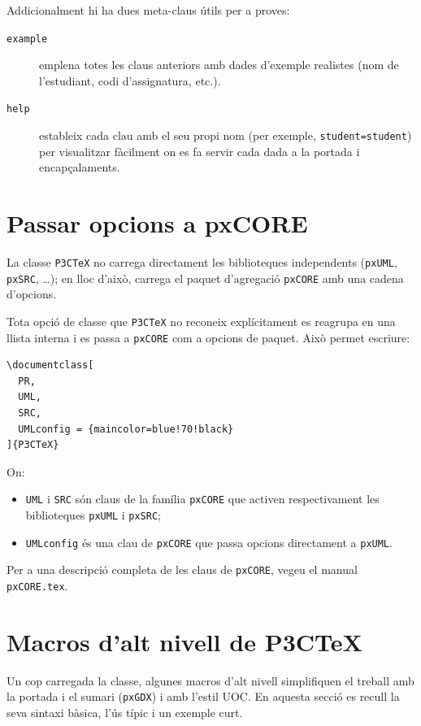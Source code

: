 \documentclass[default]{P3CTeX}
\begin{document}
Addicionalment hi ha dues meta-claus útils per a proves:

\begin{description}
  \item[\texttt{example}] emplena totes les claus anteriors amb dades
    d'exemple realistes (nom de l'estudiant, codi d'assignatura, etc.).
  \item[\texttt{help}] estableix cada clau amb el seu propi nom (per
    exemple, \texttt{student=student}) per visualitzar fàcilment on es
    fa servir cada dada a la portada i encapçalaments.
\end{description}

\section{Passar opcions a pxCORE}\label{sec:pxcore-bridge}

La classe \texttt{P3CTeX} no carrega directament les biblioteques
independents (\texttt{pxUML}, \texttt{pxSRC}, \dots); en lloc d'això,
carrega el paquet d'agregació \texttt{pxCORE} amb una cadena
d'opcions.

Tota opció de classe que \texttt{P3CTeX} no reconeix explícitament es
rea\-grupa en una llista interna i es passa a \texttt{pxCORE} com a
opcions de paquet. Això permet escriure:
\begin{verbatim}
\documentclass[
  PR,
  UML,
  SRC,
  UMLconfig = {maincolor=blue!70!black}
]{P3CTeX}
\end{verbatim}

On:
\begin{itemize}
  \item \verb|UML| i \verb|SRC| són claus de la família \texttt{pxCORE}
        que activen respectivament les biblioteques \texttt{pxUML} i
        \texttt{pxSRC};
  \item \verb|UMLconfig| és una clau de \texttt{pxCORE} que passa
        opcions directament a \texttt{pxUML}.
\end{itemize}

Per a una descripció completa de les claus de \texttt{pxCORE}, vegeu el
manual \verb|pxCORE.tex|.

\section{Macros d'alt nivell de P3CTeX}

Un cop carregada la classe, algunes macros d'alt nivell simplifiquen el
treball amb la portada i el sumari (\texttt{pxGDX}) i amb l'estil UOC.
En aquesta secció es recull la seva sintaxi bàsica, l'ús típic i un
exemple curt.
\end{document}
